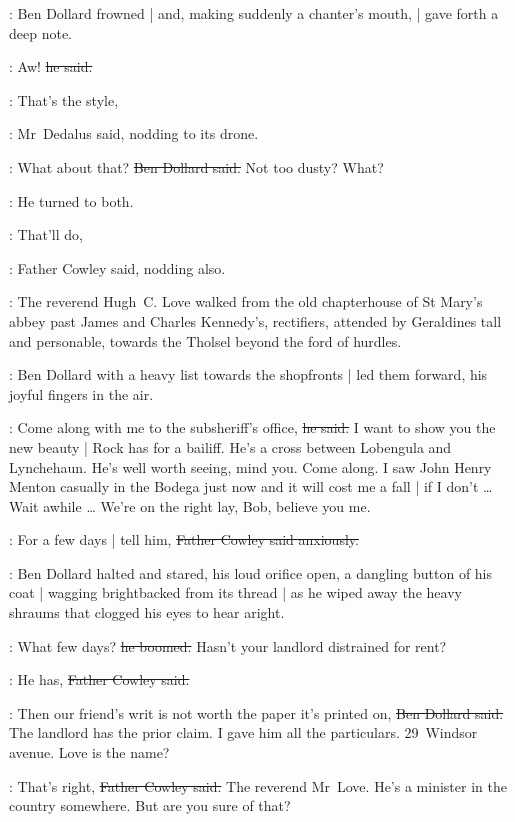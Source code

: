 :
Ben Dollard frowned |
and, making suddenly a chanter's mouth, |
gave forth a deep note.

\dollard:
Aw!
\sout{he said.}

\simon:
That's the style,

:
Mr~Dedalus said,
nodding to its drone.

\dollard:
What about that?
\sout{Ben Dollard said.}
Not too dusty?
What?

:
He turned to both.

\cowley:
That'll do,

:
Father Cowley said,
nodding also.

\begin{interject}
    :
    The reverend Hugh~C. Love
    walked from the old chapterhouse of St Mary's abbey
    past James and Charles Kennedy's, rectifiers,
    attended by Geraldines tall and personable,
    towards the Tholsel beyond the ford of hurdles.
\end{interject}%

:
Ben Dollard with a heavy list towards the shopfronts |
led them forward,
his joyful fingers in the air.

\dollard:
Come along with me to the subsheriff's office,
\sout{he said.}
I want to show you the new beauty |
Rock has for a bailiff.
He's a cross between Lobengula and Lynchehaun.
He's well worth seeing, mind you.
Come along.
I saw John Henry Menton casually in the Bodega just now
and it will cost me a fall |
if I don't \ldots
Wait awhile \ldots
We're on the right lay, Bob, believe you me.

\cowley:
For a few days |
tell him,
\sout{Father Cowley said anxiously.}

:
Ben Dollard halted and stared,%
his loud orifice open,
a dangling button of his coat |
wagging brightbacked from its thread |
as he wiped away the heavy shraums that clogged his eyes
to hear aright.

\dollard:
What few days?
\sout{he boomed.}
Hasn't your landlord distrained for rent?

\cowley:
He has,
\sout{Father Cowley said.}

\dollard:
Then our friend's writ is not worth the paper it's printed on,
\sout{Ben Dollard said.}
The landlord has the prior claim.
I gave him all the particulars.
29~Windsor avenue.
Love is the name?

\cowley:
That's right,
\sout{Father Cowley said.}
The reverend Mr~Love.
He's a minister in the country somewhere.
But are you sure of that?

